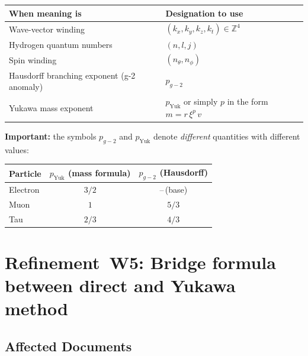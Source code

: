 \begin{center}
\renewcommand{\arraystretch}{1.4}
{\footnotesize
\begin{tabular}{>{\raggedright\arraybackslash}p{6.0cm}>{\raggedright\arraybackslash}p{6.5cm}}
\toprule
\textbf{When meaning is} & \textbf{Designation to use} \\
\midrule
Wave-vector winding &
  $(k_x, k_y, k_z, k_t) \in \mathbb{Z}^4$ \\
Hydrogen quantum numbers &
  $(n,l,j)$ \\
Spin winding &
  $(n_\theta, n_\phi)$ \\
Hausdorff branching exponent (g-2 anomaly) &
  $p_{g\!-\!2}$ \\
Yukawa mass exponent &
  $p_{\text{Yuk}}$ or simply $p$ in the form $m = r\,\xi^p\,v$ \\
\bottomrule
\end{tabular}
}
\renewcommand{\arraystretch}{1.0}
\end{center}

\textbf{Important:} the symbols $p_{g\!-\!2}$ and $p_{\text{Yuk}}$
denote \emph{different} quantities with different values:

\begin{center}
{\footnotesize
\begin{tabular}{lcc}
\toprule
\textbf{Particle} & \textbf{$p_{\text{Yuk}}$} (mass formula) & \textbf{$p_{g\!-\!2}$} (Hausdorff) \\
\midrule
Electron & $3/2$  & --\,(base) \\
Muon     & $1$    & $5/3$ \\
Tau      & $2/3$  & $4/3$ \\
\bottomrule
\end{tabular}
}
\end{center}

\section{\texorpdfstring{Refinement~W5: Bridge formula between direct and Yukawa method}{Refinement W5: Bridge formula between direct and Yukawa method}}

\subsection*{Affected Documents}

